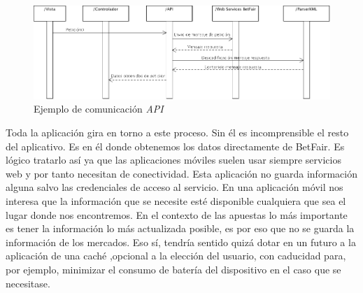  \begin{figure}[h!]
    \centering
       \includegraphics[width=0.95\linewidth]{./images/modelo_accion.png}
     \caption{Ejemplo de comunicación \emph{API} }
   \label{fig:proceso}
\end{figure}
 
    
    Toda la aplicación gira en torno a este proceso. Sin él es incomprensible el resto del aplicativo. Es en él donde obtenemos los datos directamente de BetFair. Es lógico tratarlo así ya que las aplicaciones móviles suelen usar siempre servicios web y por tanto necesitan de conectividad. Esta aplicación no guarda información alguna salvo las credenciales de acceso al servicio. En una aplicación móvil nos interesa que la información que se necesite esté disponible cualquiera que sea el lugar donde nos encontremos. En el contexto de las apuestas lo más importante es tener la información lo más actualizada posible, es por eso que no se guarda la información de los mercados. Eso sí, tendría sentido quizá dotar en un futuro a la aplicación de una caché ,opcional a la elección del usuario, con caducidad para, por ejemplo, minimizar el consumo de batería del dispositivo en el caso que se necesitase.  
   
